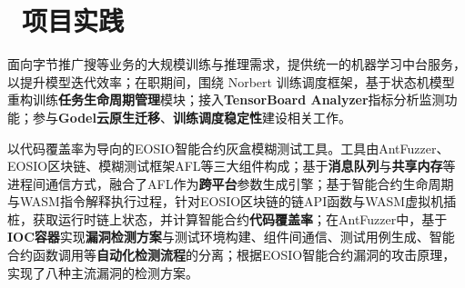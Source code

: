 \documentclass{resume}
\begin{document}


\section{\faUsers\ 项目实践}

  \begin{onehalfspacing}

  面向字节推广搜等业务的大规模训练与推理需求，提供统一的机器学习中台服务，以提升模型迭代效率；在职期间，围绕 Norbert 训练调度框架，基于状态机模型重构训练\textbf{任务生命周期管理}模块；接入\textbf{TensorBoard Analyzer}指标分析监测功能；参与\textbf{Godel云原生迁移}、\textbf{训练调度稳定性}建设相关工作。
  \end{onehalfspacing}

  \begin{onehalfspacing}
    以代码覆盖率为导向的EOSIO智能合约灰盒模糊测试工具。工具由AntFuzzer、EOSIO区块链、模糊测试框架AFL等三大组件构成；基于\textbf{消息队列}与\textbf{共享内存}等进程间通信方式，融合了AFL作为\textbf{跨平台}参数生成引擎；基于智能合约生命周期与WASM指令解释执行过程，针对EOSIO区块链的链API函数与WASM虚拟机插桩，获取运行时链上状态，并计算智能合约\textbf{代码覆盖率}；在AntFuzzer中，基于\textbf{IOC容器}实现\textbf{漏洞检测方案}与测试环境构建、组件间通信、测试用例生成、智能合约函数调用等\textbf{自动化检测流程}的分离；根据EOSIO智能合约漏洞的攻击原理，实现了八种主流漏洞的检测方案。
  \end{onehalfspacing}
\end{document}
